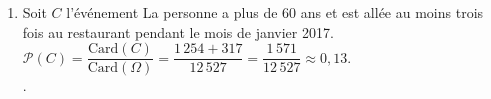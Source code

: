 \begin{enumerate}
\begin{enumerate}
      \item Soit $C$ l'événement  \og La personne a plus de 60 ans et est allée au moins trois fois au restaurant pendant le mois de janvier 2017\fg{}. \\ [1mm]
      $\mathcal{P}(C) =\dfrac{\textrm{Card}(C)}{\textrm{Card}(\Omega)} =\dfrac{1\,254+317}{12\,527} =\dfrac{1\,571}{12\,527} \approx 0,13.$ \\ [1mm]
      .
   \end{enumerate}
\end{enumerate}
